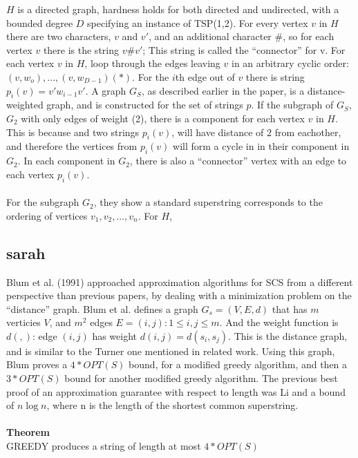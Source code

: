 \documentclass[letterpaper,11pt,titlepage]{article}
\begin{document}
$H$ is a directed graph, hardness holds for both directed and undirected, with a bounded degree $D$ specifying an instance of TSP(1,2).  For every vertex $v$ in $H$ there are two characters, $v$ and $v'$, and an additional character $\#$, so for each vertex $v$ there is the string $v\#v'$; This string is called the ``connector'' for v.  For each vertex $v$ in $H$, loop through the edges leaving $v$ in an arbitrary cyclic order: $(v, w_o),...,(v,w_{D-1})(*)$.  For the $i$th edge out of $v$ there is string $p_i(v) = v'w_{i-1}v'$.  A graph $G_S$, as described earlier in the paper, is a distance-weighted graph, and is constructed for the set of strings $p$.  If the subgraph of $G_S$, $G_2$ with only edges of weight (2), there is a component for each vertex $v$ in $H$.  This is because and two strings $p_i(v)$, will have distance of $2$ from eachother, and therefore the vertices from $p_i(v)$ will form a cycle in in their component in $G_2$.  In each component in $G_2$, there is also a ``connector'' vertex with an edge to each vertex $p_i(v)$.  \\ \\
For the subgraph $G_2$, they show a standard superstring corresponds to the ordering of vertices $v_1,v_2, \ldots,v_n$.  For $H$, 


\subsection{sarah}

Blum et al. (1991) approached approximation algorithms for SCS from a different perspective than previous papers, by dealing with a minimization problem on the ``distance'' graph.  Blum et al. defines a graph $G_s = (V, E, d)$ that has $m$ verticies $V$, and $m^2$ edges $E = {(i,j): 1 \leq i, j \leq m}$.  And the weight function is $d(,)$: edge $(i,j)$ has weight $d(i,j) = d(s_i, s_j)$.  This is the distance graph, and is similar to the Turner one mentioned in related work.  Using this graph, Blum proves a $4*OPT(S)$ bound, for a modified greedy algorithm, and then a $3*OPT(S)$ bound for another modified greedy algorithm.  The previous best proof of an approximation guarantee with respect to length was Li and a bound of $n\log n$, where n is the length of the shortest common superstring.  \\ \\

 




\textbf{Theorem}\\
GREEDY produces a string of length at most $4 * OPT(S)$
\end{document}
